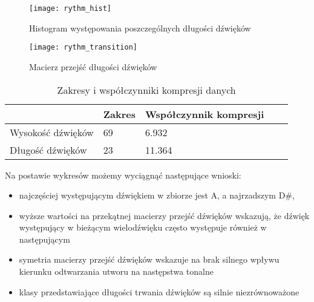 {{        %
        \begin{figure}
            \centering
            \texttt{[image: rythm\_hist]}
            \caption{Histogram występowania poszczególnych długości dźwięków}
            \label{rythm_hist}
        \end{figure}

        \begin{figure}
            \centering
            \texttt{[image: rythm\_transition]}
            \caption{Macierz przejść długości dźwięków}
            \label{rythm_transition}
        \end{figure}

        \begin{table}
            \begin{center}
                \begin{tabular}{ |p{2.5cm}|p{2.5cm}|p{2.5cm}|p{2.5cm}|p{2.5cm}| }
                \hline
                 & Zakres & Współczynnik kompresji \\ 
                \hline
                Wysokość dźwięków & 69 & 6.932 \\  
                \hline
                Długość dźwięków & 23 & 11.364 \\
                \hline
                \end{tabular}
            \end{center}
            \caption{Zakresy i współczynniki kompresji danych} \label{range_and_compression}
        \end{table}

        Na postawie wykresów możemy wyciągnąć następujące wnioski:
        \begin{itemize}
            \item najczęściej występującym dźwiękiem w zbiorze jest A, a najrzadszym D\#,
            \item wyższe wartości na przekątnej macierzy przejść dźwięków wskazują, że dźwięk występujący w bieżącym wielodźwięku
            często występuje również w następującym
            \item symetria macierzy przejść dźwięków wskazuje na brak silnego wpływu kierunku odtwarzania utworu na następstwa tonalne
            \item klasy przedstawiające długości trwania dźwięków są silnie niezrównoważone
        \end{itemize}
    }

}
